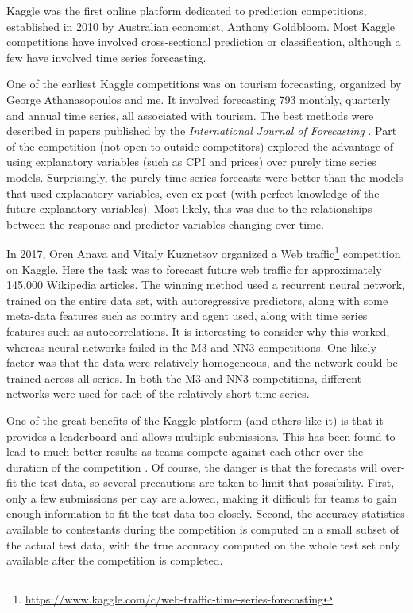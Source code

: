 \documentclass[11pt,a4paper,]{article}
\begin{document}
Kaggle was the first online platform dedicated to prediction competitions, established in 2010 by Australian economist, Anthony Goldbloom. Most Kaggle competitions have involved cross-sectional prediction or classification, although a few have involved time series forecasting.

One of the earliest Kaggle competitions was on tourism forecasting, organized by George Athanasopoulos and me. It involved forecasting 793 monthly, quarterly and annual time series, all associated with tourism. The best methods were described in papers published by the \emph{International Journal of Forecasting} \autocite{AHSW11}. Part of the competition (not open to outside competitors) explored the advantage of using explanatory variables (such as CPI and prices) over purely time series models. Surprisingly, the purely time series forecasts were better than the models that used explanatory variables, even ex post (with perfect knowledge of the future explanatory variables). Most likely, this was due to the relationships between the response and predictor variables changing over time.

In 2017, Oren Anava and Vitaly Kuznetsov organized a Web traffic\footnote{\url{https://www.kaggle.com/c/web-traffic-time-series-forecasting}} competition on Kaggle. Here the task was to forecast future web traffic for approximately 145,000 Wikipedia articles. The winning method used a recurrent neural network, trained on the entire data set, with autoregressive predictors, along with some meta-data features such as country and agent used, along with time series features such as autocorrelations. It is interesting to consider why this worked, whereas neural networks failed in the M3 and NN3 competitions. One likely factor was that the data were relatively homogeneous, and the network could be trained across all series. In both the M3 and NN3 competitions, different networks were used for each of the relatively short time series.

One of the great benefits of the Kaggle platform (and others like it) is that it provides a leaderboard and allows multiple submissions. This has been found to lead to much better results as teams compete against each other over the duration of the competition \autocite{AH11}. Of course, the danger is that the forecasts will over-fit the test data, so several precautions are taken to limit that possibility. First, only a few submissions per day are allowed, making it difficult for teams to gain enough information to fit the test data too closely. Second, the accuracy statistics available to contestants during the competition is computed on a small subset of the actual test data, with the true accuracy computed on the whole test set only available after the competition is completed.
\end{document}
